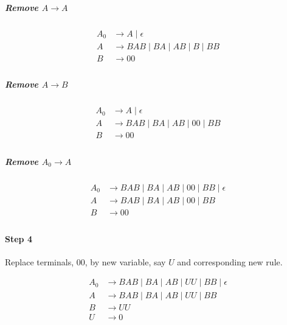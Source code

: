\documentclass{article}
\begin{document}
\subparagraph{Remove $A \longrightarrow A$}

\begin{align*}
	A_0 & \longrightarrow A \;|\; \epsilon                       \\
	A   & \longrightarrow BAB \;|\; BA \;|\; AB \;|\; B \;|\; BB \\
	B   & \longrightarrow 00                                     \\
\end{align*}

\subparagraph{Remove $A \longrightarrow B$}

\begin{align*}
	A_0 & \longrightarrow A \;|\; \epsilon                        \\
	A   & \longrightarrow BAB \;|\; BA \;|\; AB \;|\; 00 \;|\; BB \\
	B   & \longrightarrow 00                                      \\
\end{align*}

\subparagraph{Remove $A_0 \longrightarrow A$}

\begin{align*}
	A_0 & \longrightarrow BAB \;|\; BA \;|\; AB \;|\; 00 \;|\; BB \;|\; \epsilon \\
	A   & \longrightarrow BAB \;|\; BA \;|\; AB \;|\; 00 \;|\; BB                \\
	B   & \longrightarrow 00                                                     \\
\end{align*}

\paragraph{Step 4} Replace terminals, 00, by new variable, say $U$ and corresponding new rule.

\begin{align*}
	A_0 & \longrightarrow BAB \;|\; BA \;|\; AB \;|\; UU \;|\; BB \;|\; \epsilon \\
	A   & \longrightarrow BAB \;|\; BA \;|\; AB \;|\; UU \;|\; BB                \\
	B   & \longrightarrow UU                                                     \\
	U   & \longrightarrow 0                                                      \\
\end{align*}
\end{document}
